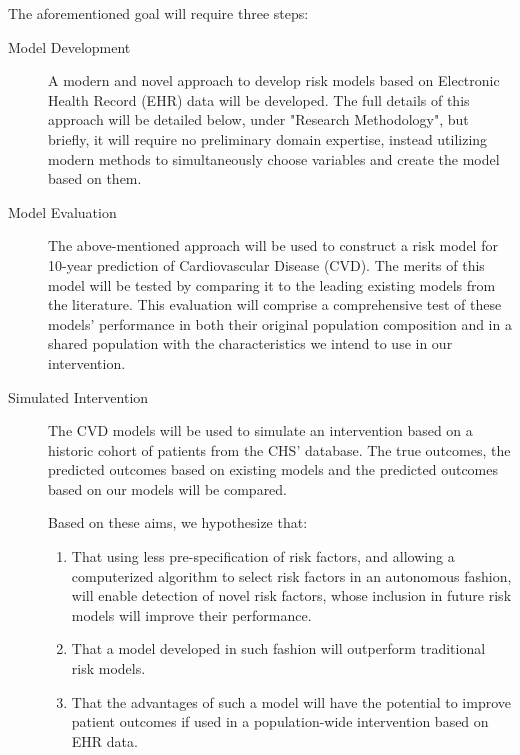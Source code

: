 \documentclass[a4paper,12pt]{article}
\begin{document}
	The aforementioned goal will require three steps:
	\begin{description}
		
		\item[Model Development] A modern and novel approach to develop risk models based on Electronic Health Record (EHR) data will be developed. The full details of this approach will be detailed below, under "Research Methodology", but briefly, it will require no preliminary domain expertise, instead utilizing modern methods to simultaneously choose variables and create the model based on them.
		
		\item[Model Evaluation] The above-mentioned approach will be used to construct a risk model for 10-year prediction of Cardiovascular Disease (CVD). The merits of this model will be tested by comparing it to the leading existing models from the literature. This evaluation will comprise a comprehensive test of these models' performance in both their original population composition and in a shared population with the characteristics we intend to use in our intervention.
		
		\item[Simulated Intervention] The CVD models will be used to simulate an intervention based on a historic cohort of patients from the CHS' database. The true outcomes, the predicted outcomes based on existing models and the predicted outcomes based on our models will be compared.
		
		Based on these aims, we hypothesize that:
		\begin{enumerate}
			
			\item That using less pre-specification of risk factors, and allowing a computerized algorithm to select risk factors in an autonomous fashion, will enable detection of novel risk factors, whose inclusion in future risk models will improve their performance.
			
			\item That a model developed in such fashion will outperform traditional risk models.
			
			\item That the advantages of such a model will have the potential to improve patient outcomes if used in a population-wide intervention based on EHR data.
			
		\end{enumerate}
		
	\end{description}
	
\end{document}
